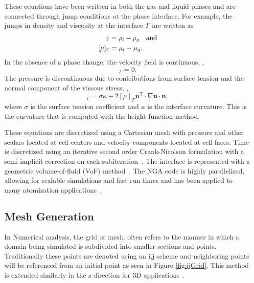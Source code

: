 These equations have been written in both the gas and liquid phases and are connected through jump conditions at the phase interface.
For example, the jumps in density and viscosity at the interface
$\Gamma$ are written as 
\begin{align}
[\rho]_\Gamma&%
=\rho_l-\rho_g\mbox{\quad and}\\
[\mu]_\Gamma&%
=\mu_l-\mu_g.
\end{align}
In the absence of a phase change, the velocity field is continuous, \ie, 
\begin{equation}
[\bm{u}]_\Gamma=0.
\end{equation}
The pressure is discontinuous due to contributions from surface tension and the normal component of the viscous stress, \ie,
\begin{equation}
[p]_\Gamma=\sigma\kappa+ 2\left[\mu\right]_\Gamma\bm{n}^\mathsf{T}\cdot\nabla\bm{u}\cdot\bm{n},
\end{equation}
where
$\sigma$ is the surface tension coefficient and
$\kappa$ is the interface curvature. This is the curvature that is computed with the height function method.

These equations are discretized using a Cartesian mesh with pressure and other scalars located at cell centers and velocity components located at cell faces. Time is discretized using an iterative second order Crank-Nicolson formulation with a semi-implicit correction on each subiteration~\cite{choi}. The interface is represented with a geometric volume-of-fluid (VoF) method~\cite{Owkes2017,Owkes2014}. The NGA code is highly parallelized, allowing for scalable simulations and fast run times and has been applied to many atomization applications~\cite{OwkesAIAA,Desjardins2013,sheehy}.

\subsection{Mesh Generation}
In Numerical analysis, the grid or mesh, often refers to the manner in which a domain being simulated is subdivided into smaller sections and points. Traditionally these points are denoted using an i,j scheme and neighboring points will be referenced from an initial point as seen in Figure \ref{fig:ijGrid}. This method is extended similarly in the z-direction for 3D applications~\cite{MIT}.  

